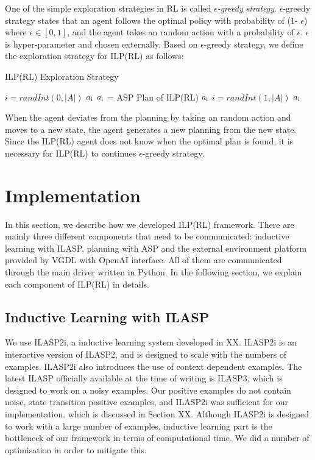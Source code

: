 One of the simple exploration strategies in RL is called \textit{$\epsilon$-greedy strategy}.
$\epsilon$-greedy strategy states that an agent follows the optimal policy with probability of (1- $\epsilon$) where $\epsilon \in [0,1]$, 
and the agent takes an random action with a probability of $\epsilon$. $\epsilon$ is hyper-parameter and chosen externally.
Based on $\epsilon$-greedy strategy, we define the exploration strategy for ILP(RL) as follows:
\begin{algorithm}
\caption{ILP(RL) Exploration Strategy}\label{euclid}
\begin{algorithmic}[1]
\State
{}
\space
\State
{}
\State $i = randInt(0, |A|)$ 
\Return $a\textsubscript{i}$
\Else \State $a\textsubscript{i}$ = ASP Plan of ILP(RL)
\Return $a\textsubscript{i}$
\EndIf
\Else \State $i = randInt(1, |A|)$
\Return $a\textsubscript{i}$
\EndIf
\EndProcedure
\end{algorithmic}
\end{algorithm}
When the agent deviates from the planning by taking an random action and moves to a new state, the agent generates a new planning from the new state. 
Since the ILP(RL) agent does not know when the optimal plan is found, it is necessary for ILP(RL) to continues $\epsilon$-greedy strategy.

\section{Implementation}
\label{Implementation}
In this section, we describe how we developed ILP(RL) framework.
There are mainly three different components that need to be communicated: inductive learning with ILASP, planning with ASP and the external environment platform provided by VGDL with OpenAI interface.
All of them are communicated through the main driver written in Python. 
In the following section, we explain each component of ILP(RL) in details.

\subsection{Inductive Learning with ILASP}
We use ILASP2i, a inductive learning system developed in XX. 
ILASP2i is an interactive version of ILASP2, and is designed to scale with the numbers of examples. 
ILASP2i also introduces the use of context dependent examples.
The latest ILASP officially available at the time of writing is ILASP3, which is designed to work on a noisy examples. 
Our positive examples do not contain noise, state transition positive examples, and ILASP2i was sufficient for our implementation.
which is discussed in Section XX. 
Although ILASP2i is designed to work with a large number of examples, inductive learning part is the bottleneck of our framework in terms of computational time. 
We did a number of optimisation in order to mitigate this. 


